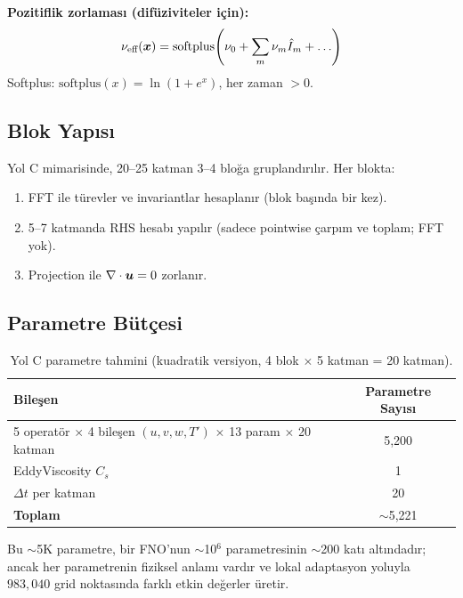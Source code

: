 \textbf{Pozitiflik zorlaması (difüziviteler için):}
\begin{equation}
    \nu_{\text{eff}}(\bm{x}) = \text{softplus}\!\left(\nu_0 + \sum_m \nu_m \hat{I}_m + \ldots\right)
    \label{eq:softplus_constraint}
\end{equation}
Softplus: $\text{softplus}(x) = \ln(1 + e^x)$, her zaman $> 0$.

\subsection{Blok Yapısı}

Yol C mimarisinde, 20--25 katman 3--4 bloğa gruplandırılır. Her blokta:
\begin{enumerate}
    \item FFT ile türevler ve invariantlar hesaplanır (blok başında bir kez).
    \item 5--7 katmanda RHS hesabı yapılır (sadece pointwise çarpım ve toplam; FFT yok).
    \item Projection ile $\nabla \cdot \bm{u} = 0$ zorlanır.
\end{enumerate}

\subsection{Parametre Bütçesi}

\begin{table}[H]
\centering
\caption{Yol C parametre tahmini (kuadratik versiyon, 4 blok $\times$ 5 katman = 20 katman).}
\label{tab:yol_c_params}
\begin{tabular}{@{}lc@{}}
\toprule
\textbf{Bileşen} & \textbf{Parametre Sayısı} \\
\midrule
5 operatör $\times$ 4 bileşen $(u,v,w,T')$ $\times$ 13 param $\times$ 20 katman & 5,200 \\
EddyViscosity $C_s$ & 1 \\
$\Delta t$ per katman & 20 \\
\midrule
\textbf{Toplam} & $\sim$5,221 \\
\bottomrule
\end{tabular}
\end{table}

Bu $\sim$5K parametre, bir FNO'nun $\sim$10$^6$ parametresinin $\sim$200 katı altındadır; ancak her parametrenin fiziksel anlamı vardır ve lokal adaptasyon yoluyla $983{,}040$ grid noktasında farklı etkin değerler üretir.


